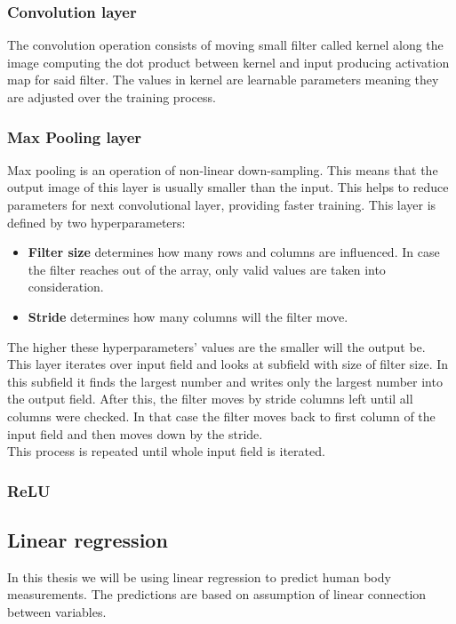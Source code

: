 \subsubsection{Convolution layer}
The convolution operation consists of moving small filter called kernel along the image computing the dot product between kernel and input producing activation map for said filter.  The values in kernel are learnable parameters meaning they are adjusted over the training process.

\subsubsection{Max Pooling layer}
Max pooling is an operation of non-linear down-sampling. This means that the output image of this layer is usually smaller than the input. This helps to reduce parameters for next convolutional layer, providing faster training.  This layer is defined by two hyperparameters:

\begin{itemize}
	\item \textbf{Filter size} determines how many rows and columns are influenced. In case the filter reaches out of the array, only valid values are taken into consideration.
	\item \textbf{Stride} determines how many columns will the filter move.
\end{itemize}

The higher these hyperparameters' values are the smaller will the output be.\\
This layer iterates over input field and looks at subfield with size of filter size. In this subfield it finds the largest number and writes only the largest number into the output field. After this, the filter moves by stride columns left until all columns were checked. In that case the filter moves back to first column of the input field and then moves down by the stride.\\ This process is repeated until whole input field is iterated.

\subsubsection{ReLU}

\subsection{Linear regression}
In this thesis we will be using linear regression to predict human body measurements. The predictions are based on assumption of linear connection between variables. 


